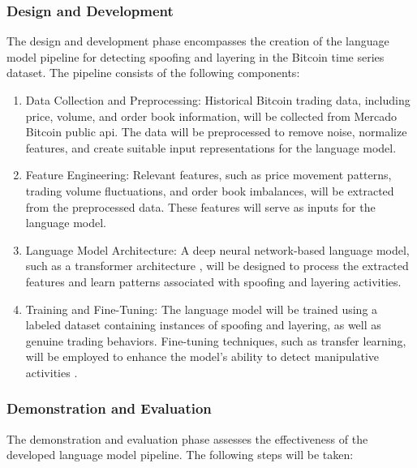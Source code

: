 \subsubsection{Design and Development}
The design and development phase encompasses the creation of the language model pipeline for detecting spoofing and
layering in the Bitcoin time series dataset. The pipeline consists of the following components:

\begin{enumerate}
    \item Data Collection and Preprocessing: Historical Bitcoin trading data, including price, volume, and order book
    information, will be collected from Mercado Bitcoin public api. The data will be preprocessed to remove noise,
    normalize features, and create suitable input representations for the language model.
    \item Feature Engineering: Relevant features, such as price movement patterns, trading volume fluctuations, and
    order book imbalances, will be extracted from the preprocessed data. These features will serve as inputs for the
    language model.
    \item Language Model Architecture: A deep neural network-based language model, such as a transformer architecture
    \cite{vaswani2017attention}, will be designed to process the extracted features and learn patterns associated with
    spoofing and layering activities.
    \item Training and Fine-Tuning: The language model will be trained using a labeled dataset containing instances of
    spoofing and layering, as well as genuine trading behaviors. Fine-tuning techniques, such as transfer learning, will
    be employed to enhance the model's ability to detect manipulative activities \cite{howard2018universal}.
\end{enumerate}

\subsubsection{Demonstration and Evaluation}
The demonstration and evaluation phase assesses the effectiveness of the developed language model pipeline. The
following steps will be taken:

